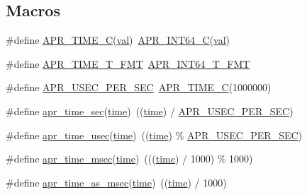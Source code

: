 \subsection*{Macros}
\begin{DoxyCompactItemize}
\item 
\#define \hyperlink{group__apr__time_gab0d08005432bbda78e03bcd2e235e7d3}{A\+P\+R\+\_\+\+T\+I\+M\+E\+\_\+C}(\hyperlink{group__apr__tables_ga4d708cd93abeca73400ed82977502830}{val})~\hyperlink{group__apr__platform_gaae749817bb595cd5dcb9c17c119ddb13}{A\+P\+R\+\_\+\+I\+N\+T64\+\_\+C}(\hyperlink{group__apr__tables_ga4d708cd93abeca73400ed82977502830}{val})
\item 
\#define \hyperlink{group__apr__time_gaad2d372b64a68d96b1e4c5f1173eb2c7}{A\+P\+R\+\_\+\+T\+I\+M\+E\+\_\+\+T\+\_\+\+F\+MT}~\hyperlink{group__apr__platform_ga41cc6dfe3d69cd66cffc8aae4b59bd08}{A\+P\+R\+\_\+\+I\+N\+T64\+\_\+\+T\+\_\+\+F\+MT}
\item 
\#define \hyperlink{group__apr__time_gab4dd3f3015d25a50f3be3e0e91043abf}{A\+P\+R\+\_\+\+U\+S\+E\+C\+\_\+\+P\+E\+R\+\_\+\+S\+EC}~\hyperlink{group__apr__time_gab0d08005432bbda78e03bcd2e235e7d3}{A\+P\+R\+\_\+\+T\+I\+M\+E\+\_\+C}(1000000)
\item 
\#define \hyperlink{group__apr__time_gae0237f70a9a3206b5263c0a474219476}{apr\+\_\+time\+\_\+sec}(\hyperlink{pcre_8txt_aafdc0b2481cb13eb2e0183db31aa1c5d}{time})~((\hyperlink{pcre_8txt_aafdc0b2481cb13eb2e0183db31aa1c5d}{time}) / \hyperlink{group__apr__time_gab4dd3f3015d25a50f3be3e0e91043abf}{A\+P\+R\+\_\+\+U\+S\+E\+C\+\_\+\+P\+E\+R\+\_\+\+S\+EC})
\item 
\#define \hyperlink{group__apr__time_gae842c7b471ccf0dc691eb2ff3cc8fc8e}{apr\+\_\+time\+\_\+usec}(\hyperlink{pcre_8txt_aafdc0b2481cb13eb2e0183db31aa1c5d}{time})~((\hyperlink{pcre_8txt_aafdc0b2481cb13eb2e0183db31aa1c5d}{time}) \% \hyperlink{group__apr__time_gab4dd3f3015d25a50f3be3e0e91043abf}{A\+P\+R\+\_\+\+U\+S\+E\+C\+\_\+\+P\+E\+R\+\_\+\+S\+EC})
\item 
\#define \hyperlink{group__apr__time_ga05d6c6ea507b74605aa2149a4410076f}{apr\+\_\+time\+\_\+msec}(\hyperlink{pcre_8txt_aafdc0b2481cb13eb2e0183db31aa1c5d}{time})~(((\hyperlink{pcre_8txt_aafdc0b2481cb13eb2e0183db31aa1c5d}{time}) / 1000) \% 1000)
\item 
\#define \hyperlink{group__apr__time_ga0ab989e84c18e63d36e653aab2821691}{apr\+\_\+time\+\_\+as\+\_\+msec}(\hyperlink{pcre_8txt_aafdc0b2481cb13eb2e0183db31aa1c5d}{time})~((\hyperlink{pcre_8txt_aafdc0b2481cb13eb2e0183db31aa1c5d}{time}) / 1000)
\item 

\end{DoxyCompactItemize}
